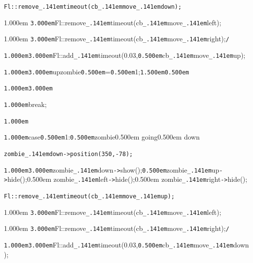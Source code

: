 \documentclass[12pt]{article}
\begin{document}
\noindent
\tt\mc {\tt\mc \kern1.000em}{\tt\mc \kern3.000em}\rm\mc {\tt /}{\tt *}Fl::remove{\tt\_\kern.141em}timeout(cb{\tt\_\kern.141em}move{\tt\_\kern.141em}down);

\noindent
\kern1.000em {\tt\mc \kern3.000em}Fl::remove{\tt\_\kern.141em}timeout(cb{\tt\_\kern.141em}move{\tt\_\kern.141em}left);

\noindent
\kern1.000em {\tt\mc \kern3.000em}Fl::remove{\tt\_\kern.141em}timeout(cb{\tt\_\kern.141em}move{\tt\_\kern.141em}right);{\tt *}{\tt /}
\tt\mc 

\noindent
{}{\tt\mc \kern1.000em}{\tt\mc \kern3.000em}Fl::add{\tt\_\kern.141em}timeout(0.03,{\tt\mc \kern0.500em}cb{\tt\_\kern.141em}move{\tt\_\kern.141em}up);

\noindent
{}{\tt\mc \kern1.000em}{\tt\mc \kern3.000em}upzombie{\tt\mc \kern0.500em}={\tt\mc \kern0.500em}1;{\tt\mc \kern1.500em}{\tt\mc \kern0.500em}

\noindent
{}{\tt\mc \kern1.000em}{\tt\mc \kern3.000em}

\noindent
{}{\tt\mc \kern1.000em}break;

\noindent
{}{\tt\mc \kern1.000em}

\noindent
{}{\tt\mc \kern1.000em}case{\tt\mc \kern0.500em}1:{\tt\mc \kern0.500em}\rm\mc {\tt /}{\tt /}zombie\kern0.500em going\kern0.500em down

\noindent
\tt\mc {\tt\mc \kern1.000em}{\tt\mc \kern3.000em}zombie{\tt\_\kern.141em}down{\tt -}{\tt >}position(350,{\tt -}78);

\noindent
{}{\tt\mc \kern1.000em}{\tt\mc \kern3.000em}zombie{\tt\_\kern.141em}down{\tt -}{\tt >}show();{\tt\mc \kern0.500em}\rm\mc {\tt /}{\tt /}zombie{\tt\_\kern.141em}up{\tt -}{\tt >}hide();\kern0.500em zombie{\tt\_\kern.141em}left{\tt -}{\tt >}hide();\kern0.500em zombie{\tt\_\kern.141em}right{\tt -}{\tt >}hide();

\noindent
\tt\mc {\tt\mc \kern1.000em}{\tt\mc \kern3.000em}\rm\mc {\tt /}{\tt *}Fl::remove{\tt\_\kern.141em}timeout(cb{\tt\_\kern.141em}move{\tt\_\kern.141em}up);

\noindent
\kern1.000em {\tt\mc \kern3.000em}Fl::remove{\tt\_\kern.141em}timeout(cb{\tt\_\kern.141em}move{\tt\_\kern.141em}left);

\noindent
\kern1.000em {\tt\mc \kern3.000em}Fl::remove{\tt\_\kern.141em}timeout(cb{\tt\_\kern.141em}move{\tt\_\kern.141em}right);{\tt *}{\tt /}
\tt\mc 

\noindent
{}{\tt\mc \kern1.000em}{\tt\mc \kern3.000em}Fl::add{\tt\_\kern.141em}timeout(0.03,{\tt\mc \kern0.500em}cb{\tt\_\kern.141em}move{\tt\_\kern.141em}down);
\end{document}
